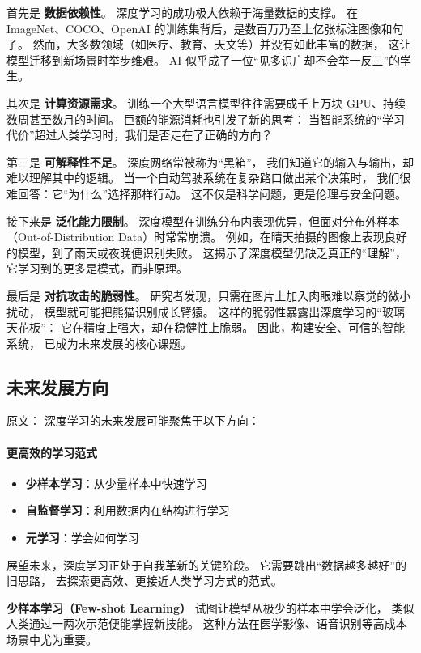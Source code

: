 首先是 {\bf 数据依赖性}。  
深度学习的成功极大依赖于海量数据的支撑。  
在 ImageNet、COCO、OpenAI 的训练集背后，是数百万乃至上亿张标注图像和句子。  
然而，大多数领域（如医疗、教育、天文等）并没有如此丰富的数据，  
这让模型迁移到新场景时举步维艰。  
AI 似乎成了一位“见多识广却不会举一反三”的学生。  

其次是 {\bf 计算资源需求}。  
训练一个大型语言模型往往需要成千上万块 GPU、持续数周甚至数月的时间。  
巨额的能源消耗也引发了新的思考：  
当智能系统的“学习代价”超过人类学习时，我们是否走在了正确的方向？  

第三是 {\bf 可解释性不足}。  
深度网络常被称为“黑箱”，  
我们知道它的输入与输出，却难以理解其中的逻辑。  
当一个自动驾驶系统在复杂路口做出某个决策时，  
我们很难回答：它“为什么”选择那样行动。  
这不仅是科学问题，更是伦理与安全问题。  

接下来是 {\bf 泛化能力限制}。  
深度模型在训练分布内表现优异，但面对分布外样本（Out-of-Distribution Data）时常常崩溃。  
例如，在晴天拍摄的图像上表现良好的模型，到了雨天或夜晚便识别失败。  
这揭示了深度模型仍缺乏真正的“理解”，  
它学习到的更多是模式，而非原理。  

最后是 {\bf 对抗攻击的脆弱性}。  
研究者发现，只需在图片上加入肉眼难以察觉的微小扰动，  
模型就可能把熊猫识别成长臂猿。  
这样的脆弱性暴露出深度学习的“玻璃天花板”：  
它在精度上强大，却在稳健性上脆弱。  
因此，构建安全、可信的智能系统，  
已成为未来发展的核心课题。


\subsection{未来发展方向}

原文：
深度学习的未来发展可能聚焦于以下方向：
\paragraph{更高效的学习范式}
\begin{itemize}
\item {\bf 少样本学习}：从少量样本中快速学习
\item {\bf 自监督学习}：利用数据内在结构进行学习
\item {\bf 元学习}：学会如何学习
\end{itemize}
展望未来，深度学习正处于自我革新的关键阶段。  
它需要跳出“数据越多越好”的旧思路，  
去探索更高效、更接近人类学习方式的范式。  

{\bf 少样本学习（Few-shot Learning）} 试图让模型从极少的样本中学会泛化，  
类似人类通过一两次示范便能掌握新技能。  
这种方法在医学影像、语音识别等高成本场景中尤为重要。  

